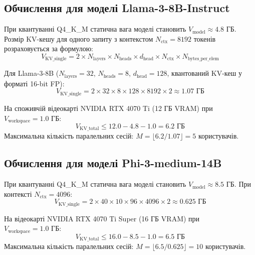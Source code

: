 \subsection{Обчислення для моделі Llama-3-8B-Instruct}
При квантуванні Q4\_K\_M статична вага моделі становить $V_{\text{model}} \approx 4.8\text{ ГБ}$. Розмір KV-кешу для одного запиту з контекстом $N_{\text{ctx}} = 8192$ токенів розраховується за формулою:
\begin{equation}
    V_{\text{KV\_single}} = 2 \times N_{\text{layers}} \times N_{\text{heads}} \times d_{\text{head}} \times N_{\text{ctx}} \times N_{\text{bytes\_per\_elem}}
\end{equation}

Для Llama-3-8B ($N_{\text{layers}} = 32$, $N_{\text{heads}} = 8$, $d_{\text{head}} = 128$, квантований KV-кеш у форматі 16-bit FP):
\begin{equation}
    V_{\text{KV\_single}} = 2 \times 32 \times 8 \times 128 \times 8192 \times 2 \approx 1.07\text{ ГБ}
\end{equation}

На споживчій відеокарті NVIDIA RTX 4070 Ti (12 ГБ VRAM) при $V_{\text{workspace}} = 1.0\text{ ГБ}$:
\begin{equation}
    V_{\text{KV\_total}} \le 12.0 - 4.8 - 1.0 = 6.2\text{ ГБ}
\end{equation}
Максимальна кількість паралельних сесій: $M = \lfloor 6.2 / 1.07 \rfloor = 5$ користувачів.

\subsection{Обчислення для моделі Phi-3-medium-14B}
При квантуванні Q4\_K\_M статична вага моделі становить $V_{\text{model}} \approx 8.5\text{ ГБ}$. При контексті $N_{\text{ctx}} = 4096$:
\begin{equation}
    V_{\text{KV\_single}} = 2 \times 40 \times 10 \times 96 \times 4096 \times 2 \approx 0.625\text{ ГБ}
\end{equation}

На відеокарті NVIDIA RTX 4070 Ti Super (16 ГБ VRAM) при $V_{\text{workspace}} = 1.0\text{ ГБ}$:
\begin{equation}
    V_{\text{KV\_total}} \le 16.0 - 8.5 - 1.0 = 6.5\text{ ГБ}
\end{equation}
Максимальна кількість паралельних сесій: $M = \lfloor 6.5 / 0.625 \rfloor = 10$ користувачів.

